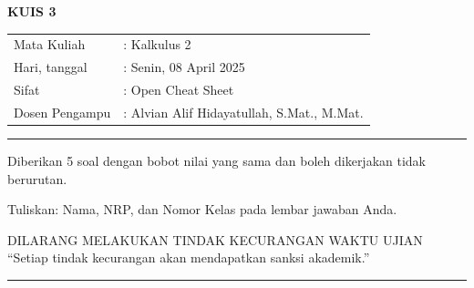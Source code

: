 \documentclass[a4paper,12pt]{article}
\begin{document}
\begin{center}
  {\Large \textbf{KUIS 3}}
\end{center}

\vspace{0.5cm}

\begin{tabular}{ll}
  Mata Kuliah    & : Kalkulus 2                               \\
  Hari, tanggal  & : Senin, 08 April 2025                     \\
  Sifat          & : Open Cheat Sheet                         \\
  Dosen Pengampu & : Alvian Alif Hidayatullah, S.Mat., M.Mat. \\
\end{tabular}

\vspace{0.5cm}
\parindent=0pt
\rule{\textwidth}{2pt}
\vspace{0.1cm}


Diberikan 5 soal dengan bobot nilai yang sama dan boleh dikerjakan tidak berurutan.

Tuliskan: Nama, NRP, dan Nomor Kelas pada lembar jawaban Anda.

\vspace{0.5cm}

\begin{center}
  \textnormal{DILARANG MELAKUKAN TINDAK KECURANGAN WAKTU UJIAN} \\
  ``Setiap tindak kecurangan akan mendapatkan sanksi akademik.''
\end{center}

\vspace{0.1cm}
\rule{\textwidth}{2pt}
\vspace{0.5cm}
\end{document}
